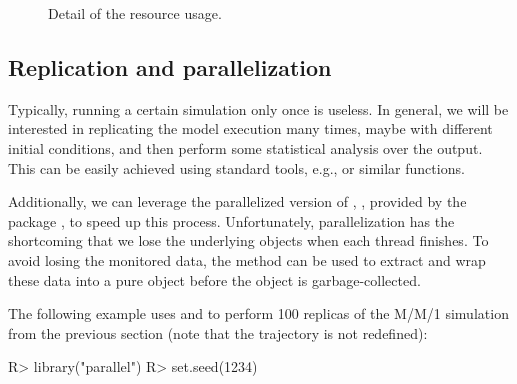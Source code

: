 \documentclass[
  nojss]{jss}
\begin{document}
\begin{CodeChunk}
\begin{figure}

{\centering {}

}

\caption[Detail of the resource usage\label{mm1-plot}]{Detail of the resource usage\label{mm1-plot}.}\label{fig:mm1-plot}
\end{figure}
\end{CodeChunk}

\hypertarget{replication-and-parallelization}{%
\subsection{Replication and
parallelization}\label{replication-and-parallelization}}

Typically, running a certain simulation only once is useless. In
general, we will be interested in replicating the model execution many
times, maybe with different initial conditions, and then perform some
statistical analysis over the output. This can be easily achieved using
standard  tools, e.g.,  or similar functions.

Additionally, we can leverage the parallelized version of
, , provided by the 
package \citep{CRAN:r}, to speed up this process. Unfortunately,
parallelization has the shortcoming that we lose the underlying
 objects when each thread finishes. To avoid losing the
monitored data, the  method can be used to extract and wrap
these data into a pure  object before the 
object is garbage-collected.

The following example uses  and  to
perform 100 replicas of the M/M/1 simulation from the previous section
(note that the trajectory is not redefined):

\begin{CodeChunk}
\begin{CodeInput}
R> library("parallel")
R> set.seed(1234)
\end{CodeInput}
\end{CodeChunk}
\end{document}
